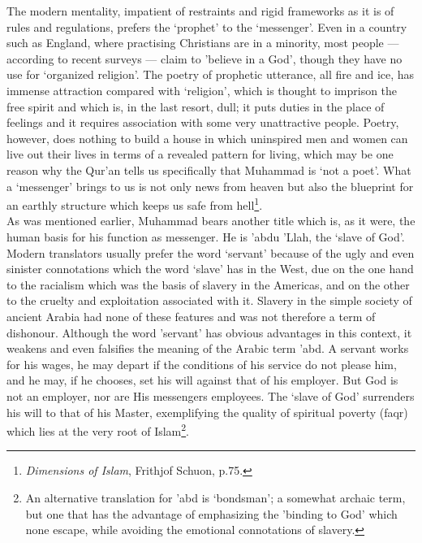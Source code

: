 \documentclass[10pt, twoside,openright]{book}
\begin{document}
The modern mentality, impatient of restraints and rigid frameworks as it is of rules and regulations, 
prefers the `prophet' to the `messenger'. Even in a country such as England, where practising 
Christians are in a minority, most people --- according to recent surveys --- claim to 'believe in a 
God', though they have no use for `organized religion'. The poetry of prophetic utterance, all fire 
and ice, has immense attraction compared with `religion', which is thought to imprison the free 
spirit and which is, in the last resort, dull; it puts duties in the place of feelings and it 
requires association with some very unattractive people. Poetry, however, does nothing to build a 
house in which uninspired men and women can live out their lives in terms of a revealed pattern for 
living, which may be one reason why the Qur'an tells us specifically that Muhammad is `not a poet'. 
What a `messenger' brings to us is not only news from heaven but also the blueprint for an earthly 
structure which keeps us safe from hell\footnote{\emph{Dimensions of Islam}, Frithjof Schuon, p.75.}. \\

As was mentioned earlier, Muhammad bears another title which is, as it were, the human basis for his 
function as messenger. He is 'abdu 'Llah, the `slave of God'. Modern translators usually prefer the 
word `servant' because of the ugly and even sinister connotations which the word `slave' has in the 
West, due on the one hand to the racialism which was the basis of slavery in the Americas, and on the 
other to the cruelty and exploitation associated with it. Slavery in the simple society of ancient 
Arabia had none of these features and was not therefore a term of dishonour. Although the word 
'servant' has obvious advantages in this context, it weakens and even falsifies the meaning of the 
Arabic term 'abd. A servant works for his wages, he may depart if the conditions of his service do 
not please him, and he may, if he chooses, set his will against that of his employer. But God is not 
an employer, nor are His messengers employees. The `slave of God' surrenders his will to that of his 
Master, exemplifying the quality of spiritual poverty (faqr) which lies at the very root of Islam\footnote{An alternative translation for 'abd is `bondsman'; a somewhat archaic term, but one that has the 
advantage of emphasizing the 'binding to God' which none escape, while avoiding the emotional 
connotations of slavery.}. \\
\end{document}
